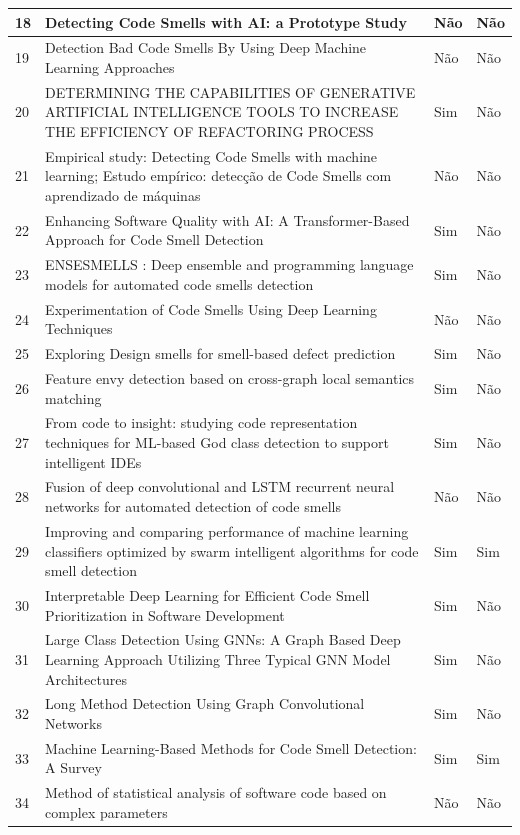 {\begin{longtable}{|p{0.8cm}|p{8cm}|p{3cm}|p{3cm}|}
    18 & Detecting Code Smells with AI: a Prototype Study & Não & Não \\ \hline
    19 & Detection Bad Code Smells By Using Deep Machine Learning Approaches & Não & Não \\ \hline
    20 & DETERMINING THE CAPABILITIES OF GENERATIVE ARTIFICIAL INTELLIGENCE TOOLS TO INCREASE THE EFFICIENCY OF REFACTORING PROCESS & Sim & Não \\ \hline
    21 & Empirical study: Detecting Code Smells with machine learning; Estudo empírico: detecção de Code Smells com aprendizado de máquinas & Não & Não \\ \hline
    22 & Enhancing Software Quality with AI: A Transformer-Based Approach for Code Smell Detection & Sim & Não \\ \hline
    23 & ENSESMELLS : Deep ensemble and programming language models for automated code smells detection & Sim & Não \\ \hline
    24 & Experimentation of Code Smells Using Deep Learning Techniques & Não & Não \\ \hline
    25 & Exploring Design smells for smell-based defect prediction & Sim & Não \\ \hline
    26 & Feature envy detection based on cross-graph local semantics matching & Sim & Não \\ \hline
    27 & From code to insight: studying code representation techniques for ML-based God class detection to support intelligent IDEs & Sim & Não \\ \hline
    28 & Fusion of deep convolutional and LSTM recurrent neural networks for automated detection of code smells & Não & Não \\ \hline
    29 & Improving and comparing performance of machine learning classifiers optimized by swarm intelligent algorithms for code smell detection & Sim & Sim \\ \hline
    30 & Interpretable Deep Learning for Efficient Code Smell Prioritization in Software Development & Sim & Não \\ \hline
    31 & Large Class Detection Using GNNs: A Graph Based Deep Learning Approach Utilizing Three Typical GNN Model Architectures & Sim & Não \\ \hline
    32 & Long Method Detection Using Graph Convolutional Networks & Sim & Não \\ \hline
    33 & Machine Learning-Based Methods for Code Smell Detection: A Survey & Sim & Sim \\ \hline
    34 & Method of statistical analysis of software code based on complex parameters & Não & Não \\ \hline

\end{longtable}}
